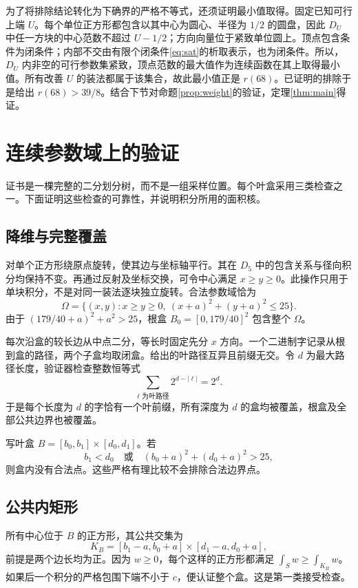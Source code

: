 \documentclass[11pt]{article}
\begin{document}
为了将排除结论转化为下确界的严格不等式，还须证明最小值取得。固定已知可行上端 $U$。每个单位正方形都包含以其中心为圆心、半径为 $1/2$ 的圆盘，因此 $D_U$ 中任一方块的中心范数不超过 $U-1/2$；方向向量位于紧致单位圆上。顶点包含条件为闭条件；内部不交由有限个闭条件\eqref{eq:sat}的析取表示，也为闭条件。所以，$D_U$ 内非空的可行参数集紧致，顶点范数的最大值作为连续函数在其上取得最小值。所有改善 $U$ 的装法都属于该集合，故此最小值正是 $r(68)$。已证明的排除于是给出 $r(68)>39/8$。结合下节对命题\ref{prop:weight}的验证，定理\ref{thm:main}得证。

\section{连续参数域上的验证}\label{sec:validation}
证书是一棵完整的二分划分树，而不是一组采样位置。每个叶盒采用三类检查之一。下面证明这些检查的可靠性，并说明积分所用的面积核。

\subsection{降维与完整覆盖}
对单个正方形绕原点旋转，使其边与坐标轴平行。其在 $D_5$ 中的包含关系与径向积分均保持不变。再通过反射及坐标交换，可令中心满足 $x\ge y\ge0$。此操作只用于单块积分，不是对同一装法逐块独立旋转。合法参数域恰为
\begin{equation}\label{eq:domain}
\Omega=\{(x,y):x\ge y\ge0,\ (x+a)^2+(y+a)^2\le25\}.
\end{equation}
由于 $(179/40+a)^2+a^2>25$，根盒 $B_0=[0,179/40]^2$ 包含整个 $\Omega$。

每次沿盒的较长边从中点二分，等长时固定先分 $x$ 方向。一个二进制字记录从根到盒的路径，两个子盒均取闭盒。给出的叶路径互异且前缀无交。令 $d$ 为最大路径长度，验证器检查整数恒等式
\begin{equation}\label{eq:kraft}
\sum_{\ell\text{ 为叶路径}}2^{d-|\ell|}=2^d.
\end{equation}
于是每个长度为 $d$ 的字恰有一个叶前缀，所有深度为 $d$ 的盒均被覆盖，根盒及全部公共边界也被覆盖。

写叶盒 $B=[b_0,b_1]\times[d_0,d_1]$。若
\begin{equation}\label{eq:excluded}
b_1<d_0\quad\text{或}\quad(b_0+a)^2+(d_0+a)^2>25,
\end{equation}
则盒内没有合法点。这些严格有理比较不会排除合法边界点。

\subsection{公共内矩形}
所有中心位于 $B$ 的正方形，其公共交集为
\[
K_B=[b_1-a,b_0+a]\times[d_1-a,d_0+a],
\]
前提是两个边长均为正。因为 $w\ge0$，每个这样的正方形都满足 $\int_Sw\ge\int_{K_B}w$。如果后一个积分的严格包围下端不小于 $c$，便认证整个盒。这是第一类接受检查。
\end{document}
